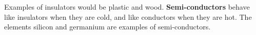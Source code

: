       \label{m38706*id66098} Examples of insulators would be plastic and wood. \textbf{Semi-conductors} behave like insulators when they are cold, and like conductors when they are hot. The elements silicon and germanium are examples of semi-conductors.\par 

